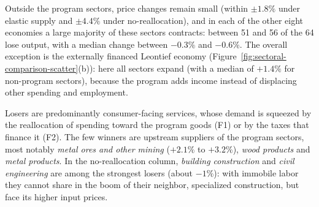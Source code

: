 Outside the program sectors, price changes remain small (within $\pm 1.8\%$ under elastic supply and $\pm 4.4\%$ under no-reallocation), and in each of the other eight economies a large majority of these sectors contracts: between 51 and 56 of the 64 lose output, with a median change between $-0.3\%$ and $-0.6\%$. The overall exception is the externally financed Leontief economy (Figure~\ref{fig:sectoral-comparison-scatter}(b)): here all sectors expand (with a median of $+1.4\%$ for non-program sectors), because the program adds income instead of displacing other spending and employment.

Losers are predominantly consumer-facing services, whose demand is squeezed by the reallocation of spending toward the program goods (F1) or by the taxes that finance it (F2). The few winners are upstream suppliers of the program sectors, most notably \emph{metal ores and other mining} ($+2.1\%$ to $+3.2\%$), \emph{wood products} and \emph{metal products}. In the no-reallocation column, \emph{building construction} and \emph{civil engineering} are among the strongest losers (about $-1\%$): with immobile labor they cannot share in the boom of their neighbor, specialized construction, but face its higher input prices. 




